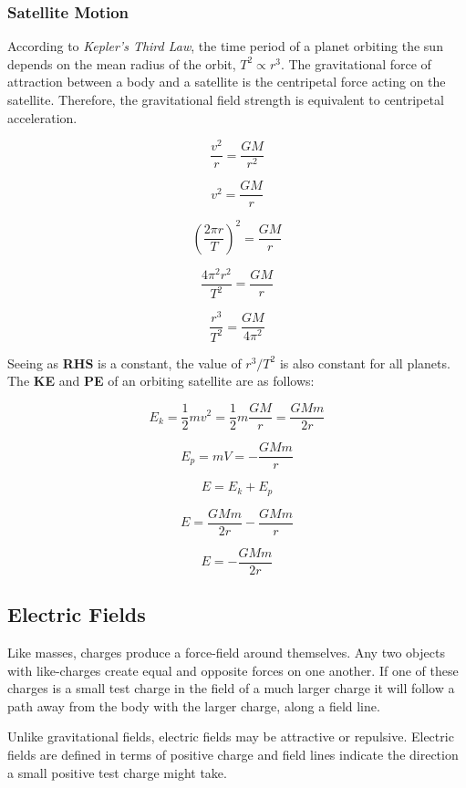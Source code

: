\documentclass[12pt]{article}
\begin{document}
\subsubsection{Satellite Motion}
\label{sec:org7c46f6a}

According to \emph{Kepler's Third Law}, the time period of a planet orbiting the sun depends on the mean radius of the orbit,  \(T^2 \propto r^3\). The gravitational force of attraction between a body and a satellite is the centripetal force acting on the satellite. Therefore, the gravitational field strength is equivalent to centripetal acceleration.

\[\dfrac{v^2}{r} = \dfrac{GM}{r^2}\]

\[v^2 = \dfrac{GM}{r}\]

\[\left (\dfrac{2 \pi r}{T} \right )^2 = \dfrac{GM}{r}\]

\[\dfrac{4 \pi^2 r^2}{T^2} = \dfrac{GM}{r}\]

\[\dfrac{r^3}{T^2} = \dfrac{GM}{4 \pi^2 }\]

Seeing as \textbf{RHS} is a constant, the value of \(r^3/T^2\) is also constant for all planets. The \textbf{KE} and \textbf{PE} of an orbiting satellite are as follows:

\[E_k = \dfrac{1}{2} m v^2 = \dfrac{1}{2} m \dfrac{GM}{r} = \dfrac{GMm}{2r}\]

\[E_p = mV = -\dfrac{GMm}{r}\]

\[ E = E_k + E_p\]

\[E = \dfrac{GMm}{2r} -\dfrac{GMm}{r} \]

\[E =-\dfrac{GMm}{2r} \]

\subsection{Electric Fields}
\label{sec:orgacdffbd}

Like masses, charges produce a force-field around themselves. Any two objects with like-charges create equal and opposite forces on one another. If one of these charges is a small test charge in the field of a much larger charge it will follow a path away from the body with the larger charge, along a field line.

Unlike gravitational fields, electric fields may be attractive or repulsive. Electric fields are defined in terms of positive charge and field lines indicate the direction a small positive test charge might take.
\end{document}
